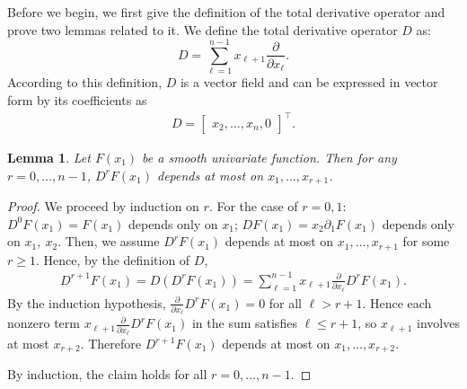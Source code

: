 \documentclass[11pt]{article}
\newtheorem{lemma}{Lemma}
\begin{document}
Before we begin, we first give the definition of the total derivative operator and prove two lemmas related to it. We define the total derivative operator $D$ as:
	\begin{equation}\label{eq:D}
		D = \sum_{\ell=1}^{n-1} x_{\ell+1} \frac{\partial}{\partial x_\ell}.
	\end{equation}
According to this definition, $D$ is a vector field and can be expressed in vector form by its coefficients as 
\begin{align}\label{field-D}
	D=\begin{bmatrix}
		x_2,\ldots,x_{n},0
	\end{bmatrix}^\top.
\end{align}

\begin{lemma}\label{lem-1}
	Let $F(x_1)$ be a smooth univariate function. Then for any $r=0,\ldots,n-1$, $D^r F(x_1)$ depends at most on $x_1,\ldots,x_{r+1}$.   
\end{lemma}
\begin{proof}
	We proceed by induction on $r$. For the case of $r=0,1$: $D^0F(x_1)=F(x_1)$ depends only on $x_1$; $DF(x_1)=x_2\partial_1F(x_1)$ depends only on $x_1,~x_2$. Then, we assume $D^rF(x_1)$ depends at most on $x_1,\ldots,x_{r+1}$ for some $r\geq 1$. Hence, by the definition of $D$,
	\begin{align*}
	D^{r+1}F(x_1)=D(D^rF(x_1))=\sum_{\ell=1}^{n-1}x_{\ell+1}\frac{\partial}{\partial x_\ell}D^rF(x_1).
	\end{align*}
	By the induction hypothesis, $\frac{\partial}{\partial x_\ell}D^rF(x_1)=0$ for all $\ell>r+1$. Hence each nonzero term $x_{\ell+1}\frac{\partial}{\partial x_\ell}D^rF(x_1)$ in the sum satisfies $\ell\leq r+1$, so $x_{\ell+1}$ involves at most $x_{r+2}$. Therefore $D^{r+1}F(x_1)$ depends at most on $x_1,\ldots,x_{r+2}$.
	
	By induction, the claim holds for all $r=0,\ldots,n-1$.
\end{proof}
\end{document}
